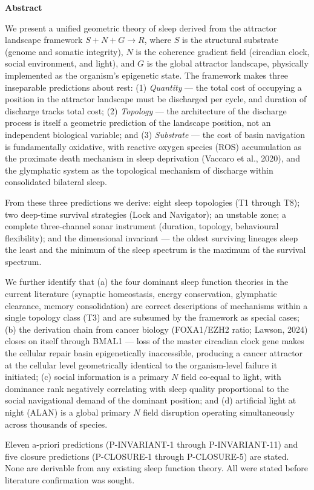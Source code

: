 \documentclass[10pt, a4paper]{article}
\begin{document}
\begin{mdframed}[backgroundcolor=shadelight,
  linecolor=headergreen,linewidth=0.8pt,
  innertopmargin=0.7em,innerbottommargin=0.7em,
  innerleftmargin=0.9em,innerrightmargin=0.9em]
\textbf{Abstract}

\smallskip
We present a unified geometric theory
of sleep derived from the attractor
landscape framework
$S + N + G \rightarrow R$, where $S$
is the structural substrate (genome and
somatic integrity), $N$ is the coherence
gradient field (circadian clock, social
environment, and light), and $G$ is the
global attractor landscape, physically
implemented as the organism's epigenetic
state. The framework makes three
inseparable predictions about rest:
(1) \textit{Quantity} --- the total cost
of occupying a position in the attractor
landscape must be discharged per cycle,
and duration of discharge tracks total
cost; (2) \textit{Topology} --- the
architecture of the discharge process is
itself a geometric prediction of the
landscape position, not an independent
biological variable; and (3)
\textit{Substrate} --- the cost of basin
navigation is fundamentally oxidative,
with reactive oxygen species (ROS)
accumulation as the proximate death
mechanism in sleep deprivation (Vaccaro
et al., 2020), and the glymphatic system
as the topological mechanism of discharge
within consolidated bilateral sleep.

From these three predictions we derive:
eight sleep topologies (T1 through T8);
two deep-time survival strategies (Lock
and Navigator); an unstable zone; a
complete three-channel sonar instrument
(duration, topology, behavioural
flexibility); and the dimensional
invariant --- the oldest surviving
lineages sleep the least and the minimum
of the sleep spectrum is the maximum of
the survival spectrum.

We further identify that (a) the four
dominant sleep function theories in the
current literature (synaptic homeostasis,
energy conservation, glymphatic
clearance, memory consolidation) are
correct descriptions of mechanisms
within a single topology class (T3)
and are subsumed by the framework as
special cases; (b) the derivation chain
from cancer biology (FOXA1/EZH2 ratio;
Lawson, 2024) closes on itself through
BMAL1 --- loss of the master circadian
clock gene makes the cellular repair
basin epigenetically inaccessible,
producing a cancer attractor at the
cellular level geometrically identical
to the organism-level failure it
initiated; (c) social information is
a primary $N$ field co-equal to light,
with dominance rank negatively
correlating with sleep quality
proportional to the social navigational
demand of the dominant position; and
(d) artificial light at night (ALAN)
is a global primary $N$ field disruption
operating simultaneously across
thousands of species.

Eleven a-priori predictions
(P-INVARIANT-1 through P-INVARIANT-11)
and five closure predictions
(P-CLOSURE-1 through P-CLOSURE-5)
are stated. None are derivable from
any existing sleep function theory.
All were stated before literature
confirmation was sought.
\end{mdframed}
\end{document}

